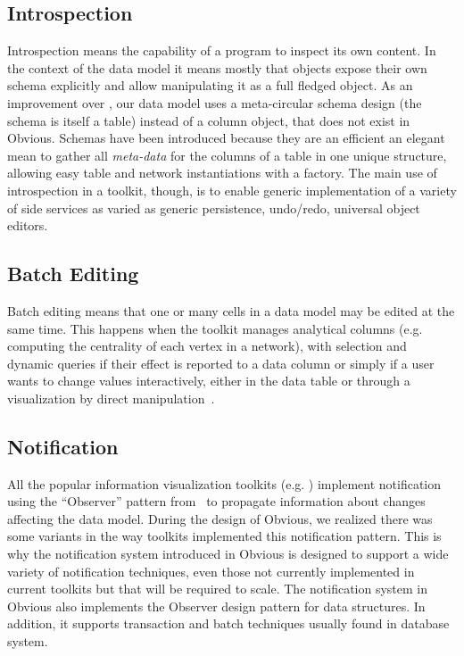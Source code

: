 \subsection{Introspection}

Introspection means the capability of a program to inspect its own
content. In the context of the data model it means mostly that objects
expose their own schema explicitly and allow manipulating it as a
full fledged object.  As an improvement over \cite{DesignPatternsIV},
our data model uses a meta-circular schema design (the schema is
itself a table) instead of a column object, that does not exist in
Obvious.  Schemas have been introduced because they are an efficient
an elegant mean to gather all \emph{meta-data} for the columns of a
table in one unique structure, allowing easy table and network
instantiations with a factory.  The main use of introspection in a
toolkit, though, is to enable generic implementation of a variety of
side services as varied as generic persistence, undo/redo, universal
object editors.

\subsection{Batch Editing}

Batch editing means that one or many cells in a data model may be
edited at the same time.  This happens when the toolkit manages
analytical columns (e.g. computing the centrality of each vertex in a
network), with selection and dynamic queries if their effect is
reported to a data column or simply if a user wants to change values
interactively, either in the data table or through a visualization by
direct manipulation~\cite{Discovery3}.

\subsection{Notification}

All the popular information visualization toolkits
(e.g. \cite{Prefuse, InfoVis, jung2003, Discovery1}) implement
notification using the ``Observer'' pattern from~\cite{DesignPatterns}
to propagate information about changes affecting the data model.
During the design of Obvious, we realized there was some variants in
the way toolkits implemented this notification pattern.  This is why
the notification system introduced in Obvious is designed to support a
wide variety of notification techniques, even those not currently
implemented in current toolkits but that will be required to scale.
The notification system in Obvious also implements the Observer design
pattern for data structures.  In addition, it supports transaction and
batch techniques usually found in database system.

